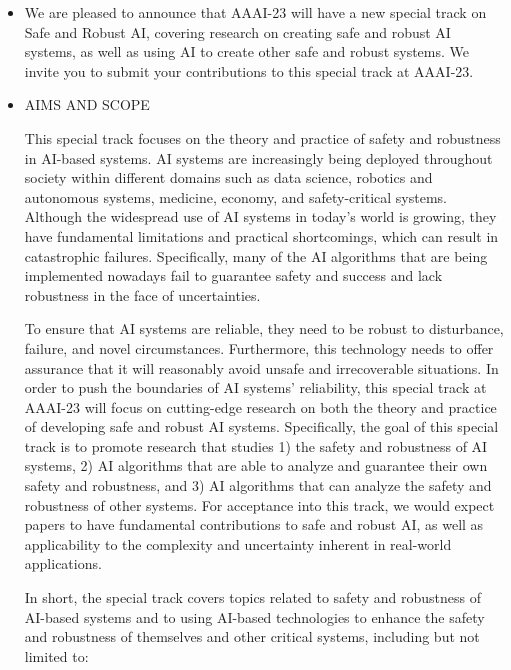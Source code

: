 \documentclass[prodmode,acmtecs]{acmsmall} %
\begin{document}
\begin{itemize}\item  We are pleased to announce that AAAI-23 will have a new special track on Safe and Robust AI, covering research on creating safe and robust AI systems, as well as using AI to create other safe and robust systems. We invite you to submit your contributions to this special track at AAAI-23. 
 
\item  AIMS AND SCOPE 
 
  This special track focuses on the theory and practice of safety and robustness in AI-based systems. AI systems are increasingly being deployed throughout society within different domains such as data science, robotics and autonomous systems, medicine, economy, and safety-critical systems. Although the widespread use of AI systems in today's world is growing, they have fundamental limitations and practical shortcomings, which can result in catastrophic failures. Specifically, many of the AI algorithms that are being implemented nowadays fail to guarantee safety and success and lack robustness in the face of uncertainties.  
 
  To ensure that AI systems are reliable, they need to be robust to disturbance, failure, and novel circumstances. Furthermore, this technology needs to offer assurance that it will reasonably avoid unsafe and irrecoverable situations. In order to push the boundaries of AI systems' reliability, this special track at AAAI-23 will focus on cutting-edge research on both the theory and practice of developing safe and robust AI systems. Specifically, the goal of this special track is to promote research that studies 1) the safety and robustness of AI systems, 2) AI algorithms that are able to analyze and guarantee their own safety and robustness, and 3) AI algorithms that can analyze the safety and robustness of other systems. For acceptance into this track, we would expect papers to have fundamental contributions to safe and robust AI, as well as applicability to the complexity and uncertainty inherent in real-world applications. 
 
  In short, the special track covers topics related to safety and robustness of AI-based systems and to using AI-based technologies to enhance the safety and robustness of themselves and other critical systems, including but not limited to:  
 

\end{itemize}
\end{document}
